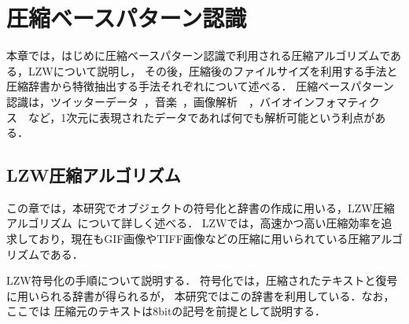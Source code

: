 \chapter{圧縮ベースパターン認識}

本章では，はじめに圧縮ベースパターン認識で利用される圧縮アルゴリズムである，LZWについて説明し，
その後，圧縮後のファイルサイズを利用する手法と圧縮辞書から特徴抽出する手法それぞれについて述べる．
圧縮ベースパターン認識は，ツイッターデータ~\cite{Nishida:2011:TCD:2064448.2064473}，音楽~\cite{Wolf04algorithmicclustering}，画像解析~\cite{Li2006}~\cite{e15010407}，バイオインフォマティクス~\cite{li2001information}~\cite{1405274}など，1次元に表現されたデータであれば何でも解析可能という利点がある．

\section{LZW圧縮アルゴリズム}
この章では，本研究でオブジェクトの符号化と辞書の作成に用いる，LZW圧縮アルゴリズム~\cite{Welch:1984:THD:1319729.1320134}について詳しく述べる．
LZWでは，高速かつ高い圧縮効率を追求しており，現在もGIF画像やTIFF画像などの圧縮に用いられている圧縮アルゴリズムである．

LZW符号化の手順について説明する．
符号化では，圧縮されたテキストと復号に用いられる辞書が得られるが，
本研究ではこの辞書を利用している．なお，ここでは
圧縮元のテキストは8bitの記号を前提として説明する．

\begin{table}[tb]%
\caption{初期状態のLZW辞書．}
\label{lz}
\begin{center}
\end{center}
\end{table}

